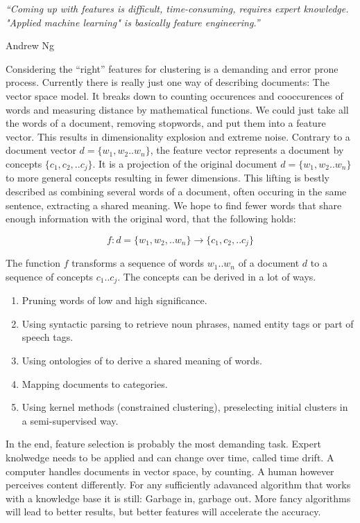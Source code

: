 \epigraph{\emph{
  ``Coming up with features is difficult, time-consuming, requires expert knowledge. "Applied machine learning" is basically feature engineering.''
}}{ Andrew Ng }

Considering the ``right'' features for clustering is a demanding and error prone process. Currently there is really just one way of describing documents: The vector space model. It breaks down to counting occurences and cooccurences of words and measuring distance by mathematical functions. We could just take all the words of a document, removing stopwords, and put them into a feature vector. This results in dimensionality explosion and extreme noise. Contrary to a document vector $d = \{w_1,w_2..w_n\}$, the feature vector represents a document by concepts $\{c_1,c_2,..c_j\}$. It is a projection of the original document $d = \{w_1,w_2..w_n\}$ to more general concepts resulting in fewer dimensions. This lifting is bestly described as combining several words of a document, often occuring in the same sentence, extracting a shared meaning. We hope to find fewer words that share enough information with the original word, that the following holds:
  
  \begin{equation}
    f : d=\{w_1,w_2,..w_n\} \to \{c_1,c_2,..c_j\}
  \end{equation}

The function $f$ transforms a sequence of words $w_1..w_n$ of a document $d$ to a sequence of concepts $c_1..c_j$. The concepts can be derived in a lot of ways.

  \begin{enumerate}
    \item Pruning words of low and high significance.
    \item Using syntactic parsing to retrieve noun phrases, named entity tags or part of speech tags.
    \item Using ontologies of \wordnet{} to derive a shared meaning of words.
    \item Mapping documents to \wiki{} categories.
    \item Using kernel methods (constrained clustering), preselecting initial clusters in a semi-supervised way.
  \end{enumerate}

In the end, feature selection is probably the most demanding task. Expert knolwedge needs to be applied and can change over time, called time drift. A computer handles documents in vector space, by counting. A human however perceives content differently. For any sufficiently adavanced algorithm that works with a knowledge base it is still: Garbage in, garbage out. More fancy algorithms will lead to better results, but better features will accelerate the accuracy.\\

